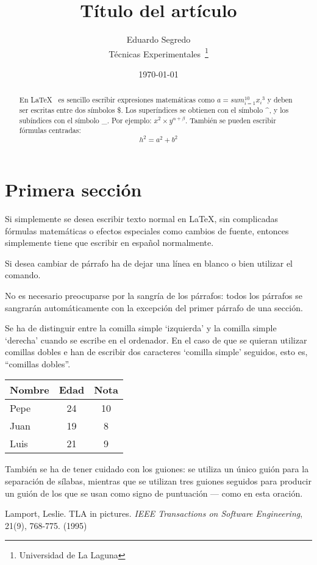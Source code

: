 \documentclass[a4paper,12pt]{article}
\begin{document}
\title{Título del artículo}
\author{Eduardo Segredo \\
        Técnicas Experimentales~\footnote{Universidad de La Laguna}
       }
\date{\today}
\maketitle
\begin{abstract}
En \LaTeX{}~\cite{Lam:86} es sencillo escribir expresiones
matemáticas como $a=sum_{i=1}^{10} {x_i}^{3}$
y deben ser escritas entre dos símbolos \$.
Los superíndices se obtienen con el símbolo \^{}, y
los subíndices con el símbolo \_.
Por ejemplo: $x^2 \times y^{\alpha + \beta}$.
También se pueden escribir fórmulas centradas:
\[h^2 = a^2 + b^2\]
\end{abstract}

\section{Primera sección}
Si simplemente se desea escribir texto normal en LaTeX,
sin complicadas f\'ormulas matem\'aticas o efectos especiales
como cambios de fuente, entonces simplemente tiene que escribir
en espa\~nol normalmente. \par
Si desea cambiar de párrafo ha de dejar una línea en blanco o bien
utilizar el comando.

No es necesario preocuparse por la sangría de los párrafos:
todos los párrafos se sangrarán automáticamente con la excepción
del primer párrafo de una sección.

Se ha de distinguir entre la comilla simple `izquierda' 
y la comilla simple `derecha' cuando se escribe en el ordenador.
En el caso de que se quieran utilizar comillas dobles e han de
escribir dos caracteres `comilla simple' seguidos, esto es,
``comillas dobles''.



\bigskip
\begin{tabular}{|l|c|c|}
\hline
  Nombre & Edad & Nota \\ \hline
  Pepe   &   24 &   10 \\ \hline
  Juan   &   19 &    8 \\ \hline
  Luis   &   21 &    9 \\ \hline
\end{tabular}

También se ha de tener cuidado con los guiones: se utiliza un único
guión para la separación de sílabas, mientras que se utilizan
tres guiones seguidos para producir un guión de los que se usan
como signo de puntuación --- como en esta oración.



\begin{thebibliography}{OO}
    Lamport, Leslie.
    TLA in pictures.
    \emph{IEEE Transactions on Software Engineering},
    21(9), 768-775.
    (1995)
\end{thebibliography}
\end{document}
